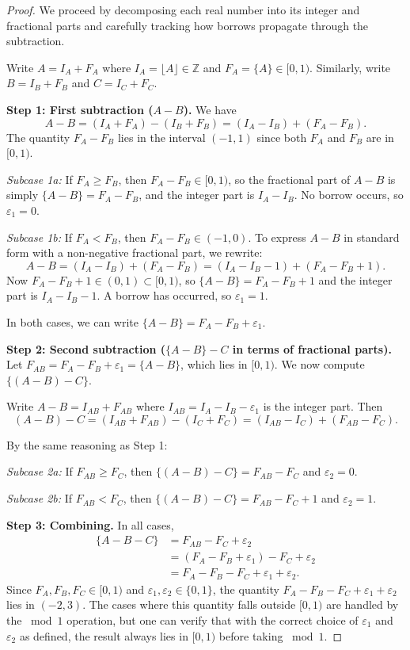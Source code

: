 \documentclass[11pt]{article}
\begin{document}
\begin{proof}
We proceed by decomposing each real number into its integer and fractional parts and carefully tracking how borrows propagate through the subtraction.

Write $A = I_A + F_A$ where $I_A = \lfloor A \rfloor \in \mathbb{Z}$ and $F_A = \{A\} \in [0,1)$. Similarly, write $B = I_B + F_B$ and $C = I_C + F_C$.

\textbf{Step 1: First subtraction ($A - B$).} We have
\[
A - B = (I_A + F_A) - (I_B + F_B) = (I_A - I_B) + (F_A - F_B).
\]
The quantity $F_A - F_B$ lies in the interval $(-1, 1)$ since both $F_A$ and $F_B$ are in $[0,1)$.

\textit{Subcase 1a:} If $F_A \geq F_B$, then $F_A - F_B \in [0,1)$, so the fractional part of $A - B$ is simply $\{A - B\} = F_A - F_B$, and the integer part is $I_A - I_B$. No borrow occurs, so $\varepsilon_1 = 0$.

\textit{Subcase 1b:} If $F_A < F_B$, then $F_A - F_B \in (-1, 0)$. To express $A - B$ in standard form with a non-negative fractional part, we rewrite:
\[
A - B = (I_A - I_B) + (F_A - F_B) = (I_A - I_B - 1) + (F_A - F_B + 1).
\]
Now $F_A - F_B + 1 \in (0, 1) \subset [0,1)$, so $\{A - B\} = F_A - F_B + 1$ and the integer part is $I_A - I_B - 1$. A borrow has occurred, so $\varepsilon_1 = 1$.

In both cases, we can write $\{A - B\} = F_A - F_B + \varepsilon_1$.

\textbf{Step 2: Second subtraction ($\{A-B\} - C$ in terms of fractional parts).} Let $F_{AB} = F_A - F_B + \varepsilon_1 = \{A - B\}$, which lies in $[0,1)$. We now compute $\{(A-B) - C\}$.

Write $A - B = I_{AB} + F_{AB}$ where $I_{AB} = I_A - I_B - \varepsilon_1$ is the integer part. Then
\[
(A - B) - C = (I_{AB} + F_{AB}) - (I_C + F_C) = (I_{AB} - I_C) + (F_{AB} - F_C).
\]

By the same reasoning as Step 1:

\textit{Subcase 2a:} If $F_{AB} \geq F_C$, then $\{(A-B) - C\} = F_{AB} - F_C$ and $\varepsilon_2 = 0$.

\textit{Subcase 2b:} If $F_{AB} < F_C$, then $\{(A-B) - C\} = F_{AB} - F_C + 1$ and $\varepsilon_2 = 1$.

\textbf{Step 3: Combining.} In all cases,
\begin{align*}
\{A - B - C\} &= F_{AB} - F_C + \varepsilon_2 \\
&= (F_A - F_B + \varepsilon_1) - F_C + \varepsilon_2 \\
&= F_A - F_B - F_C + \varepsilon_1 + \varepsilon_2.
\end{align*}
Since $F_A, F_B, F_C \in [0,1)$ and $\varepsilon_1, \varepsilon_2 \in \{0,1\}$, the quantity $F_A - F_B - F_C + \varepsilon_1 + \varepsilon_2$ lies in $(-2, 3)$. The cases where this quantity falls outside $[0,1)$ are handled by the $\bmod 1$ operation, but one can verify that with the correct choice of $\varepsilon_1$ and $\varepsilon_2$ as defined, the result always lies in $[0,1)$ before taking $\bmod 1$.
\end{proof}
\end{document}
